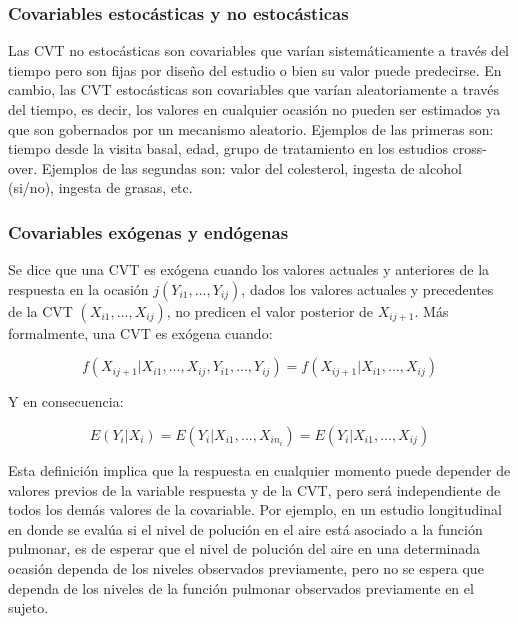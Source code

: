 \documentclass[spanish]{article}
\numberwithin{figure}{subsection}
\numberwithin{equation}{subsection}
\numberwithin{table}{subsection}
\begin{document}
\subsubsection{Covariables estocásticas y no estocásticas}

Las CVT no estocásticas son covariables que varían sistemáticamente a través
del tiempo pero son fijas por diseño del estudio o bien su valor puede
predecirse. En cambio, las CVT estocásticas son covariables que varían
aleatoriamente a través del tiempo, es decir, los valores en cualquier ocasión
no pueden ser estimados ya que son gobernados por un mecanismo aleatorio.
Ejemplos de las primeras son: tiempo desde la visita basal, edad, grupo de
tratamiento en los estudios cross-over. Ejemplos de las segundas son: valor del
colesterol, ingesta de alcohol (si/no), ingesta de grasas, etc.

\subsubsection{Covariables exógenas y endógenas}

Se dice que una CVT es exógena cuando los valores actuales y anteriores de la
respuesta en la ocasión $j (Y_{i1}, ..., Y_{ij})$, dados los valores actuales y
precedentes de la CVT $(X_{i1}, ..., X_{ij})$, no predicen el valor posterior
de $X_{ij+1}$. Más formalmente, una CVT es exógena cuando:

\begin{equation}
	\label{exogeneidad}
	f(X_{ij+1}|X_{i1}, ..., X_{ij}, Y_{i1}, ..., Y_{ij}) =
	f(X_{ij+1}|X_{i1}, ..., X_{ij})
\end{equation}

Y en consecuencia:

\begin{equation}
	\label{exogeneidad debil}
	E(Y_i|X_i) = E(Y_i|X_{i1}, ..., X_{in_i}) = E(Y_i|X_{i1}, ..., X_{ij})
\end{equation}

Esta definición implica que la respuesta en cualquier momento puede depender de
valores previos de la variable respuesta y de la CVT, pero será independiente
de todos los demás valores de la covariable. Por ejemplo, en un estudio
longitudinal en donde se evalúa si el nivel de polución en el aire está
asociado a la función pulmonar, es de esperar que el nivel de polución del aire
en una determinada ocasión dependa de los niveles observados previamente, pero
no se espera que dependa de los niveles de la función pulmonar observados
previamente en el sujeto.
\end{document}

